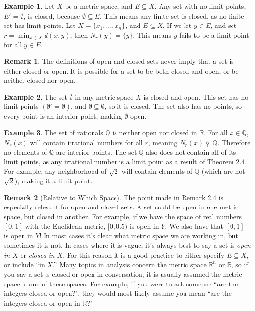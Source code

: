 \documentclass{article}
\newcommand{\R}{\mathbb{R}}
\newcommand{\Q}{\mathbb{Q}}
\theoremstyle{definition}
\newtheorem{example}{Example}[section]
\newtheorem{remark}{Remark}[section]
\begin{document}
	\begin{example}
		Let $ X $ be a metric space, and $ E\subseteq X $. Any set with no limit points, $ E'=\emptyset $, is closed, because $ \emptyset\subseteq E $. This means any finite set is closed, as no finite set has limit points. Let $ X=\{x_1,\ldots, x_n\} $, and $ E\subseteq X $. If we let $ y\in E $, and set $ r=\min_{x\in X}d(x,y) $, then $ N_r(y)=\{y\} $. This means $ y $ fails to be a limit point for all $ y\in E $.
	\end{example}
	\begin{remark}
		The definitions of open and closed sets never imply that a set is either closed or open. It is possible for a set to be both closed and open, or be neither closed nor open.
	\end{remark}
	\begin{example}
		The set $ \emptyset $ in any metric space $ X $ is closed and open. This set has no limit points $ (\emptyset'=\emptyset) $, and $ \emptyset\subseteq\emptyset $, so it is closed. The set also has no points, so every point is an interior point, making $ \emptyset $ open. 
	\end{example}
	\begin{example}
		The set of rationals $ \Q $ is neither open nor closed in $ \R $. For all $ x\in\Q $, $ N_r(x) $ will contain irrational numbers for all $ r $, meaning $ N_r(x)\not\subseteq\Q $. Therefore no elements of $ \Q $ are interior points. The set $ \Q $ also does not contain all of its limit points, as any irrational number is a limit point as a result of Theorem 2.4. For example, any neighborhood of $ \sqrt{2} $ will contain elements of $ \Q $ (which are not $ \sqrt{2} $), making it a limit point. 
	\end{example}
	\begin{remark}[Relative to Which Space]
		The point made in Remark 2.4 is especially relevant for open and closed sets. A set could be open in one metric space, but closed in another. For example, if we have the space of real numbers $ [0,1] $ with the Euclidean metric, $ [0,0.5) $ is open in $ Y $. We also have that $ [0,1] $ is open in $ Y $! In most cases it's clear what metric space we are working in, but sometimes it is not. In cases where it is vague, it's always best to say a set is \textit{open in $ X $} or \textit{closed in $ X $}. For this reason it is a good practice to either specify $ E\subseteq X $, or include ``in $ X $.'' Many topics in analysis concern the metric space $ \R^n $ or $ \R $, so if you say a set is closed or open in conversation, it is usually assumed the metric space is one of these spaces. For example, if you were to ask someone ``are the integers closed or open?", they would most likely assume you mean ``are the integers closed or open in $ \R $?" 
	\end{remark}
	
\end{document}

